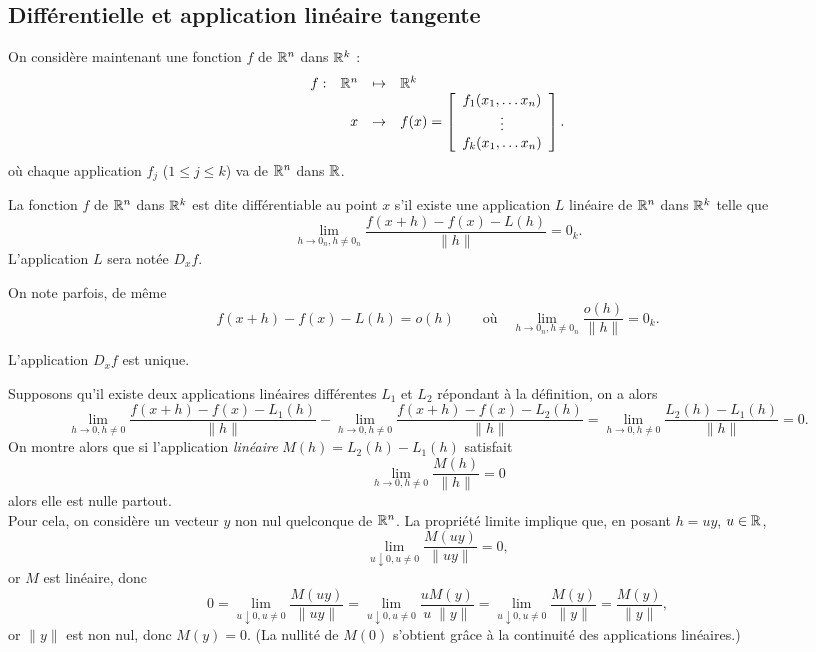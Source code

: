 \subsection{Différentielle et application linéaire tangente} 

On considère maintenant une fonction $f$ de $\mathbb{R}^n$ dans $\mathbb{R}^k$ : 
$$
\begin{array}{rrcl}
  f : & \mathbb{R}^n & \mapsto & \mathbb{R}^k \\
  & x & \to & f(x) = \left[\begin{array}{c}
      f_1(x_1, \dots x_n) \\ \vdots \\ f_k(x_1, \dots x_n)
    \end{array}\right].
\end{array}
$$
où chaque application $f_j$ ($1 \leq j \leq k$) va de $\mathbb{R}^n$ dans $\mathbb{R}$.

\begin{definition}[Différentiabilité] \label{def:differentiabilité}
  La fonction $f$ de $\mathbb{R}^n$ dans $\mathbb{R}^k$ est dite différentiable au point $x$ s'il existe une application $L$ linéaire de $\mathbb{R}^n$ dans $\mathbb{R}^k$ telle que
  $$
  \lim_{h\to 0_n, h \neq 0_n} \frac{f(x+h) - f(x) - L(h)}{\|h\|} = 0_k.
  $$
  L'application $L$ sera notée $D_x f$.
\end{definition}

\remark
On note parfois, de même 
$$
f(x+h) - f(x) - L(h) = o(h)
\qquad \text{où} \quad
\lim_{h\to 0_n, h \neq 0_n} \frac{o(h)}{\|h\|} = 0_k.
$$

\begin{proposition} \label{prop:uniciteApplicationLineaireTangente}
  L'application $D_x f$ est unique.
\end{proposition}

\proof
Supposons qu'il existe deux applications linéaires différentes $L_1$ et $L_2$ répondant à la définition, on a alors
$$
\lim_{h\to 0, h \neq 0} \frac{f(x+h) - f(x) - L_1(h)}{\|h\|}
- \lim_{h\to 0, h \neq 0} \frac{f(x+h) - f(x) - L_2(h)}{\|h\|} 
= \lim_{h\to 0, h \neq 0} \frac{L_2(h) - L_1(h)}{\|h\|} 
= 0.
$$
On montre alors que si l'application {\em linéaire} $M(h) = L_2(h) - L_1(h)$ satisfait
$$
\lim_{h \to 0, h \neq 0} \frac{M(h)}{\|h\|} 
= 0
$$
alors elle est nulle partout. \\
Pour cela, on considère un vecteur $y$ non nul quelconque de $\mathbb{R}^n$. La propriété limite implique que, en posant $h = uy$, $u \in \mathbb{R}$, 
$$
\lim_{u \downarrow 0, u \neq 0} \frac{M(u y)}{\|u y\|} = 0,
$$  
or $M$ est linéaire, donc 
$$
0
= \lim_{u \downarrow 0, u \neq 0} \frac{M(u y)}{\|u y\|} 
= \lim_{u \downarrow 0, u \neq 0} \frac{u M(y)}{u \; \|y\|} 
= \lim_{u \downarrow 0, u \neq 0} \frac{M(y)}{\|y\|} 
= \frac{M(y)}{\|y\|},
$$  
or $\|y\|$ est non nul, donc $M(y) = 0$. (La nullité de $M(0)$ s'obtient grâce à la continuité des applications linéaires.)
\eproof

